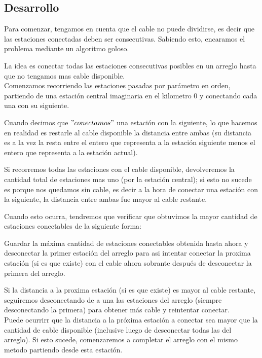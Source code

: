 \pagebreak
\subsection{Desarrollo}


 Para comenzar, tengamos en cuenta que el cable no puede dividirse, es decir que las estaciones conectadas deben ser consecutivas. Sabiendo esto, encaramos el problema mediante un algoritmo goloso.
 
 
 La idea es conectar todas las estaciones consecutivas posibles en un arreglo hasta que no tengamos mas cable disponible.\\
 
 Comenzamos recorriendo las estaciones pasadas por par\'ametro en orden, partiendo de una estaci\'on central imaginaria en el kilometro 0 y conectando cada una con su siguiente.
 
 Cuando decimos que $"conectamos"$ una estaci\'on con la siguiente, lo que hacemos en realidad es restarle al cable disponible la distancia entre ambas (su distancia es a la vez la resta entre el entero que representa a la estaci\'on siguiente menos el entero que representa a la estaci\'on actual).
 
 Si recorremos todas las estaciones con el cable disponible, devolveremos la cantidad total de estaciones mas uno (por la estaci\'on central); si esto no sucede es porque nos quedamos sin cable, es decir a la hora de conectar una estaci\'on con la siguiente, la distancia entre ambas fue mayor al cable restante.
 
 Cuando esto ocurra, tendremos que verificar que obtuvimos la mayor cantidad de estaciones conectables de la siguiente forma:
 
 Guardar la m\'axima cantidad de estaciones conectables obtenida hasta ahora y desconectar la primer estaci\'on del arreglo para asi intentar conectar la proxima estaci\'on (si es que existe) con el cable ahora sobrante despu\'es de desconectar la primera del arreglo.
 
 Si la distancia a la proxima estaci\'on (si es que existe) es mayor al cable restante, seguiremos desconectando de a una las estaciones del arreglo (siempre desconectando la primera) para obtener m\'as cable y reintentar conectar.\\
 Puede ocurrirr que la distancia a la pr\'oxima estaci\'on a conectar sea mayor que la cantidad de cable disponible (inclusive luego de desconectar todas las del arreglo). Si esto sucede, comenzaremos a completar el arreglo con el mismo metodo partiendo desde esta estaci\'on.\\
 
